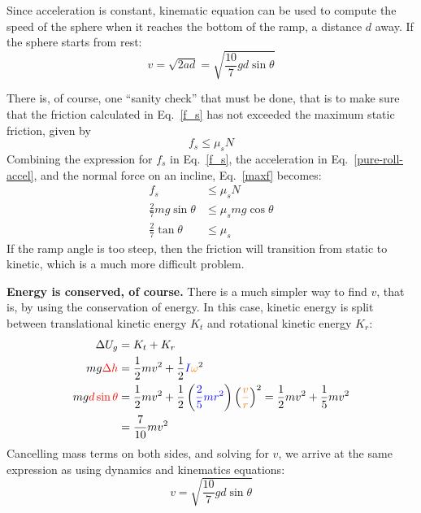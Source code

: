 \documentclass{../../../oss-handout}
\begin{document}
Since acceleration is constant, kinematic equation can be used to compute the
speed of the sphere when it reaches the bottom of the ramp, a distance $d$ away.
If the sphere starts from rest:
\begin{equation}
  v=\sqrt{2ad}=\sqrt{\frac{10}{7}gd\sin\theta}
\end{equation}

There is, of course, one ``sanity check'' that must be done, that is to make
sure that the friction calculated in Eq.~\ref{f_s} has not exceeded the maximum
static friction, given by
\begin{equation}
  f_s\leq\mu_s N
  \label{maxf}
\end{equation}
Combining the expression for $f_s$ in Eq.~\ref{f_s}, the acceleration in
Eq.~\ref{pure-roll-accel}, and the normal force on an incline, Eq.~\ref{maxf}
becomes:
\begin{align}
  f_s&\leq\mu_sN\\
  \frac27mg\sin\theta&\leq\mu_smg\cos\theta\\
  \frac27\tan\theta&\leq\mu_s
\end{align}
If the ramp angle is too steep, then the friction will transition from static
to kinetic, which is a much more difficult problem.

\textbf{Energy is conserved, of course.} There is a much simpler way to find
$v$, that is, by using the conservation of energy. In this case, kinetic
energy is split between translational kinetic energy $K_t$ and rotational
kinetic energy $K_r$:
\begin{align*}
  \Delta U_g&=K_t+K_r\\
  mg\textcolor{red}{\Delta h}&=\frac12 mv^2+
  \frac12
  \textcolor{blue}{I}\textcolor{orange}{\omega}^2\\
  mg\textcolor{red}{d\sin\theta}&=\frac12 mv^2+\frac12
  \left(\textcolor{blue}{\frac25 mr^2}\right)
  \left(\textcolor{orange}{\frac{v}{r}}\right)^2
  =\frac12 mv^2+\frac15mv^2\\
  &=\frac7{10}mv^2
\end{align*}
Cancelling mass terms on both sides, and solving for $v$, we arrive at
the same expression as using dynamics and kinematics equations:
\begin{equation}
  v=\sqrt{\frac{10}{7}gd\sin\theta}
\end{equation}
\end{document}
